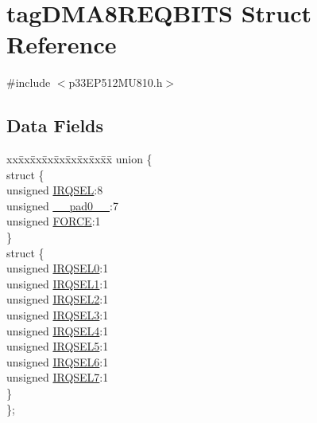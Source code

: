 \hypertarget{structtag_d_m_a8_r_e_q_b_i_t_s}{}\section{tag\+D\+M\+A8\+R\+E\+Q\+B\+I\+TS Struct Reference}
\label{structtag_d_m_a8_r_e_q_b_i_t_s}


{\ttfamily \#include $<$p33\+E\+P512\+M\+U810.\+h$>$}

\subsection*{Data Fields}
\begin{DoxyCompactItemize}
\item 
\begin{tabbing}
xx\=xx\=xx\=xx\=xx\=xx\=xx\=xx\=xx\=\kill
union \{\\
\>struct \{\\
\>\>unsigned \hyperlink{structtag_d_m_a8_r_e_q_b_i_t_s_a5e70ba01366ab2f37371d52661dd93b2}{IRQSEL}:8\\
\>\>unsigned \hyperlink{structtag_d_m_a8_r_e_q_b_i_t_s_adf71f3d8410c1f1dbbc96680a92c49af}{\_\_pad0\_\_}:7\\
\>\>unsigned \hyperlink{structtag_d_m_a8_r_e_q_b_i_t_s_a9b378a7ffc1ab4bc4a3710fb36389180}{FORCE}:1\\
\>\} \\
\>struct \{\\
\>\>unsigned \hyperlink{structtag_d_m_a8_r_e_q_b_i_t_s_ac73241b8f783760c9192dfd8a0773cad}{IRQSEL0}:1\\
\>\>unsigned \hyperlink{structtag_d_m_a8_r_e_q_b_i_t_s_a45e1f083e5a8a59f25acc35910732426}{IRQSEL1}:1\\
\>\>unsigned \hyperlink{structtag_d_m_a8_r_e_q_b_i_t_s_a60dda7474727b3624ca25fa0067a8924}{IRQSEL2}:1\\
\>\>unsigned \hyperlink{structtag_d_m_a8_r_e_q_b_i_t_s_aeaafe1b8c89398ed382054ab628aed78}{IRQSEL3}:1\\
\>\>unsigned \hyperlink{structtag_d_m_a8_r_e_q_b_i_t_s_a91c4162e0f3d4ac7adcdb49302f19840}{IRQSEL4}:1\\
\>\>unsigned \hyperlink{structtag_d_m_a8_r_e_q_b_i_t_s_a6382d50430464cf20b3dee3dbf2e8c01}{IRQSEL5}:1\\
\>\>unsigned \hyperlink{structtag_d_m_a8_r_e_q_b_i_t_s_ace52408ef8c29561f3c56a3fbcbc8217}{IRQSEL6}:1\\
\>\>unsigned \hyperlink{structtag_d_m_a8_r_e_q_b_i_t_s_acce7dedecdf1f53cdbead3edf7c5d53a}{IRQSEL7}:1\\
\>\} \\
\}; \\

\end{tabbing}\end{DoxyCompactItemize}


